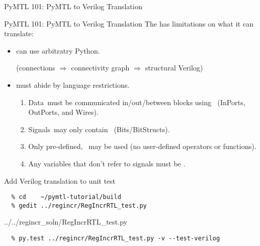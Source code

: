 \begin{frame}{PyMTL 101: PyMTL to Verilog Translation}
\vspace{0.3in}
\end{frame}

\begin{frame}{PyMTL 101: PyMTL to Verilog Translation}
The  has limitations on what it can translate:

\smallskip
\begin{itemize}
  \item {} can use arbitratry Python.

        (connections $\Rightarrow$ connectivity graph $\Rightarrow$
         structural Verilog)

  \smallskip
  \item {} must abide by language restrictions.

  \pause
  \smallskip
  \begin{enumerate}
    \item Data must be communicated in/out/between blocks
          using  (InPorts, OutPorts, and Wires).
    \smallskip
    \item Signals may only contain 
          (Bits/BitStructs).
    \smallskip
    \item Only pre-defined,  may be
          used (no user-defined operators or functions).
    \smallskip
    \item Any variables that don't refer to signals must be .
  \end{enumerate}
\end{itemize}
\end{frame}

\begin{task}\begin{frame}[fragile]{Add Verilog translation to unit test}
\vspace{-0.25in}
\begin{verbatim}
  % cd    ~/pymtl-tutorial/build
  % gedit ../regincr/RegIncrRTL_test.py
\end{verbatim}

%
{../../regincr_soln/RegIncrRTL_test.py}

\begin{verbatim}
  % py.test ../regincr/RegIncrRTL_test.py -v --test-verilog
\end{verbatim}

\end{frame}
\end{task}

